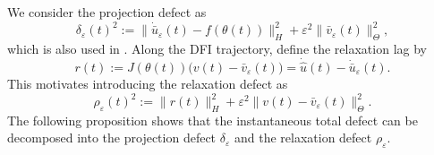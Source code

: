 \documentclass[oneside,11pt]{article}
\theoremstyle{remark}
\theoremstyle{thmstyleone}
\theoremstyle{thmstylethree}
\theoremstyle{thmstyletwo}
\newcommand{\norm}[1]{\lVert #1\rVert}
\begin{document}
We consider the projection defect as 
        \begin{equation}
          \delta_\varepsilon(t)^2
          :=
          \norm{\dot{\bar u}_\varepsilon(t)-f(\theta(t))}_H^2
          +
          \varepsilon^2\norm{\bar v_\varepsilon(t)}_\Theta^2,
          \label{eq:delta_eps_cont}
        \end{equation}
        which is also used in \cite[Section 3.1]{Feischl2024}. Along the DFI trajectory, define the relaxation lag by
\[
r(t)
:=
J(\theta(t))\bigl(v(t)-\bar v_\varepsilon(t)\bigr)
=
\dot{\hat u}(t)-\dot{\bar u}_\varepsilon(t).
\]
  This motivates introducing the relaxation defect as
        \begin{equation}
          \rho_\varepsilon(t)^2
          :=
          \norm{r(t)}_H^2
          +
          \varepsilon^2\norm{v(t)-\bar v_\varepsilon(t)}_\Theta^2.
          \label{eq:rho_eps_cont}
        \end{equation}
   The following proposition shows that the instantaneous total defect can be decomposed into the projection defect $\delta_{\varepsilon}$ and the relaxation defect $\rho_{\varepsilon}$. 
   
\end{document}
